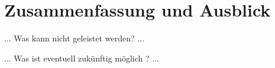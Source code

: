 \chapter{Zusammenfassung und Ausblick}

... Was kann nicht geleistet werden? ...

... Was ist eventuell zukünftig möglich ? ...